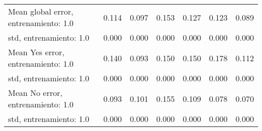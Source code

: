 \begin{longtable}{p{4cm}|p{1.5cm}|p{1.5cm}|p{1.5cm}|p{1.5cm}|p{1.5cm}|p{1.5cm}}
Mean global error, entrenamiento: 1.0 & 0.114 & 0.097 &        0.153 &     0.127 &     0.123 & 0.089 \\
std, entrenamiento: 1.0               & 0.000 & 0.000 &        0.000 &     0.000 &     0.000 & 0.000 \\
Mean Yes error, entrenamiento: 1.0    & 0.140 & 0.093 &        0.150 &     0.150 &     0.178 & 0.112 \\
std, entrenamiento: 1.0               & 0.000 & 0.000 &        0.000 &     0.000 &     0.000 & 0.000 \\
Mean No error, entrenamiento: 1.0     & 0.093 & 0.101 &        0.155 &     0.109 &     0.078 & 0.070 \\
std, entrenamiento: 1.0               & 0.000 & 0.000 &        0.000 &     0.000 &     0.000 & 0.000 \\
\end{longtable}
